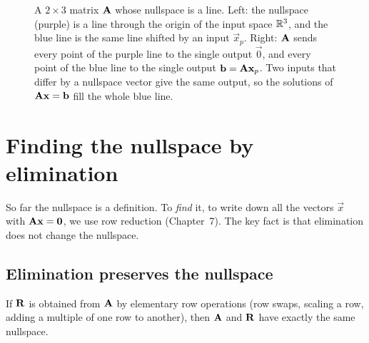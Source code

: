 \begin{figure}[htbp]
\caption{A $2\times3$ matrix $\mathbf{A}$ whose nullspace is a line. Left: the
nullspace (purple) is a line through the origin of the input space $\mathbb{R}^3$, and
the blue line is the same line shifted by an input $\vec{x}_p$. Right: $\mathbf{A}$
sends every point of the purple line to the single output $\vec{0}$, and every
point of the blue line to the single output $\mathbf{b}=\mathbf{A}\mathbf{x}_p$. Two
inputs that differ by a nullspace vector give the same output, so the solutions
of $\mathbf{A}\mathbf{x}=\mathbf{b}$ fill the whole blue line.}
\label{ch12:fig-two-spaces}
\end{figure}

\section{Finding the nullspace by elimination}

So far the nullspace is a definition. To \emph{find} it, to write down
all the vectors $\vec{x}$ with $\mathbf{A}\mathbf{x}=\mathbf{0}$, we use row reduction
(Chapter~7). The key fact is that elimination
does not change the nullspace.

\subsection{Elimination preserves the nullspace}

\begin{lemma}\label{ch12:row-ops-preserve-null}
If $\mathbf{R}$ is obtained from $\mathbf{A}$ by elementary row operations (row swaps,
scaling a row, adding a multiple of one row to another), then $\mathbf{A}$ and
$\mathbf{R}$ have exactly the same nullspace.
\end{lemma}

